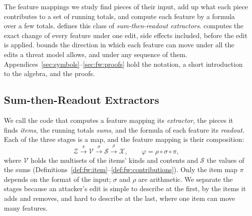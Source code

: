 
The feature mappings we study find pieces of their input, add up what each piece contributes to a set of running
totals, and compute each feature by a formula over a few totals.  defines this class of
\emph{sum-then-readout extractors}.  computes the exact change of every feature under one
edit, side effects included, before the edit is applied.  bounds the direction in which each
feature can move under all the edits a threat model allows, and under any sequence of them. Appendices~\ref{sec:symbols}--\ref{sec:fw:proofs}
hold the notation, a short introduction to the algebra, and the proofs.

\subsection{Sum-then-Readout Extractors}
\label{sec:fw:model}

We call the code that computes a feature mapping its \emph{extractor}, the pieces it finds \emph{items}, the running
totals \emph{sums}, and the formula of each feature its \emph{readout}. Each of the three stages is a map, and the feature mapping is their composition:
\begin{equation}
  \label{eq:fw:factorization}
  \mathcal{Z} \xrightarrow{\;\pi\;} \mathcal{V} \xrightarrow{\;\sigma\;} \mathcal{S}
  \xrightarrow{\;\rho\;} \mathcal{X},
  \qquad
  \varphi = \rho \circ \sigma \circ \pi,
\end{equation}
where $\mathcal{V}$ holds the multisets of the items' kinds and contents and $\mathcal{S}$ the values of the sums
(Definitions~\ref{def:fw:item}--\ref{def:fw:contributions}). Only the item map $\pi$ depends on the format of the
input; $\sigma$ and $\rho$ are arithmetic. We separate the stages because an attacker's edit is simple to describe at
the first, by the items it adds and removes, and hard to describe at the last, where one item can move many features.

